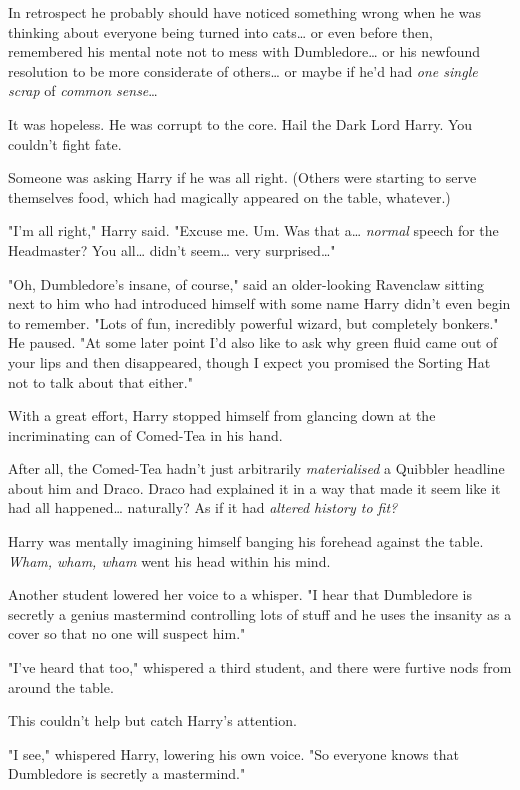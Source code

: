 In retrospect he probably should have noticed something wrong when he was 
thinking about everyone being turned into cats{\ldots} or even before then, 
remembered his mental note not to mess with Dumbledore{\ldots} or his newfound 
resolution to be more considerate of others{\ldots} or maybe if he'd had 
\emph{one single scrap} of \emph{common sense}{\ldots}

It was hopeless. He was corrupt to the core. Hail the Dark Lord Harry. You 
couldn't fight fate.

Someone was asking Harry if he was all right. (Others were starting to serve 
themselves food, which had magically appeared on the table, whatever.)

"I'm all right," Harry said. "Excuse me. Um. Was that a{\ldots} \emph{normal} 
speech for the Headmaster? You all{\ldots} didn't seem{\ldots} very 
surprised{\ldots}"

"Oh, Dumbledore's insane, of course," said an older-looking Ravenclaw sitting 
next to him who had introduced himself with some name Harry didn't even begin 
to remember. "Lots of fun, incredibly powerful wizard, but completely bonkers." 
He paused. "At some later point I'd also like to ask why green fluid came out 
of your lips and then disappeared, though I expect you promised the Sorting Hat 
not to talk about that either."

With a great effort, Harry stopped himself from glancing down at the 
incriminating can of Comed-Tea in his hand.

After all, the Comed-Tea hadn't just arbitrarily \emph{materialised} a Quibbler 
headline about him and Draco. Draco had explained it in a way that made it seem 
like it had all happened{\ldots} naturally? As if it had \emph{altered history 
to fit?}

Harry was mentally imagining himself banging his forehead against the table. 
\emph{Wham, wham, wham} went his head within his mind.

Another student lowered her voice to a whisper. "I hear that Dumbledore is 
secretly a genius mastermind controlling lots of stuff and he uses the insanity 
as a cover so that no one will suspect him."

"I've heard that too," whispered a third student, and there were furtive nods 
from around the table.

This couldn't help but catch Harry's attention.

"I see," whispered Harry, lowering his own voice. "So everyone knows that 
Dumbledore is secretly a mastermind."

